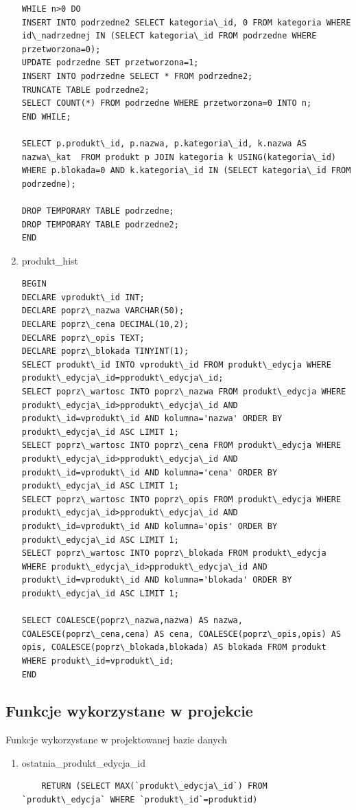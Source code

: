 \begin{enumerate}
\begin{verbatim}
WHILE n>0 DO
INSERT INTO podrzedne2 SELECT kategoria\_id, 0 FROM kategoria WHERE id\_nadrzednej IN (SELECT kategoria\_id FROM podrzedne WHERE przetworzona=0);
UPDATE podrzedne SET przetworzona=1;
INSERT INTO podrzedne SELECT * FROM podrzedne2;
TRUNCATE TABLE podrzedne2;
SELECT COUNT(*) FROM podrzedne WHERE przetworzona=0 INTO n;
END WHILE;

SELECT p.produkt\_id, p.nazwa, p.kategoria\_id, k.nazwa AS nazwa\_kat  FROM produkt p JOIN kategoria k USING(kategoria\_id) WHERE p.blokada=0 AND k.kategoria\_id IN (SELECT kategoria\_id FROM podrzedne);

DROP TEMPORARY TABLE podrzedne;
DROP TEMPORARY TABLE podrzedne2;
END
\end{verbatim}
\item produkt\_hist
\begin{verbatim}
BEGIN
DECLARE vprodukt\_id INT;
DECLARE poprz\_nazwa VARCHAR(50);
DECLARE poprz\_cena DECIMAL(10,2);
DECLARE poprz\_opis TEXT;
DECLARE poprz\_blokada TINYINT(1);
SELECT produkt\_id INTO vprodukt\_id FROM produkt\_edycja WHERE produkt\_edycja\_id=pprodukt\_edycja\_id;
SELECT poprz\_wartosc INTO poprz\_nazwa FROM produkt\_edycja WHERE produkt\_edycja\_id>pprodukt\_edycja\_id AND produkt\_id=vprodukt\_id AND kolumna='nazwa' ORDER BY produkt\_edycja\_id ASC LIMIT 1;
SELECT poprz\_wartosc INTO poprz\_cena FROM produkt\_edycja WHERE produkt\_edycja\_id>pprodukt\_edycja\_id AND produkt\_id=vprodukt\_id AND kolumna='cena' ORDER BY produkt\_edycja\_id ASC LIMIT 1;
SELECT poprz\_wartosc INTO poprz\_opis FROM produkt\_edycja WHERE produkt\_edycja\_id>pprodukt\_edycja\_id AND produkt\_id=vprodukt\_id AND kolumna='opis' ORDER BY produkt\_edycja\_id ASC LIMIT 1;
SELECT poprz\_wartosc INTO poprz\_blokada FROM produkt\_edycja WHERE produkt\_edycja\_id>pprodukt\_edycja\_id AND produkt\_id=vprodukt\_id AND kolumna='blokada' ORDER BY produkt\_edycja\_id ASC LIMIT 1;

SELECT COALESCE(poprz\_nazwa,nazwa) AS nazwa, COALESCE(poprz\_cena,cena) AS cena, COALESCE(poprz\_opis,opis) AS opis, COALESCE(poprz\_blokada,blokada) AS blokada FROM produkt WHERE produkt\_id=vprodukt\_id; 
END
\end{verbatim}
\end{enumerate}
\subsection{Funkcje wykorzystane w projekcie}
Funkcje wykorzystane w projektowanej bazie danych

\begin{enumerate}
	\item ostatnia\_produkt\_edycja\_id
	\begin{verbatim}
	RETURN (SELECT MAX(`produkt\_edycja\_id`) FROM `produkt\_edycja` WHERE `produkt\_id`=produktid)
	\end{verbatim}
\end{enumerate}
